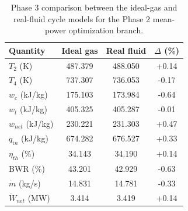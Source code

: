 \begin{table}[htbp]
    \centering
    \caption{Phase 3 comparison between the ideal-gas and real-fluid cycle models for the Phase 2 mean-power optimization branch.}
    \label{tab:phase3_comparison_phase2_optimization}
    \begin{tabular}{lccc}
        \hline
        Quantity & Ideal gas & Real fluid & $\Delta$ (\%) \\
        \hline
        $T_2$ (K) & 487.379 & 488.050 & +0.14 \\
        $T_4$ (K) & 737.307 & 736.053 & -0.17 \\
        $w_c$ (kJ/kg) & 175.103 & 173.984 & -0.64 \\
        $w_t$ (kJ/kg) & 405.325 & 405.287 & -0.01 \\
        $w_{net}$ (kJ/kg) & 230.221 & 231.303 & +0.47 \\
        $q_{in}$ (kJ/kg) & 674.282 & 676.527 & +0.33 \\
        $\eta_{th}$ (\%) & 34.143 & 34.190 & +0.14 \\
        BWR (\%) & 43.201 & 42.929 & -0.63 \\
        $\dot{m}$ (kg/s) & 14.831 & 14.781 & -0.33 \\
        $\dot{W}_{net}$ (MW) & 3.414 & 3.419 & +0.14 \\
        \hline
    \end{tabular}
\end{table}